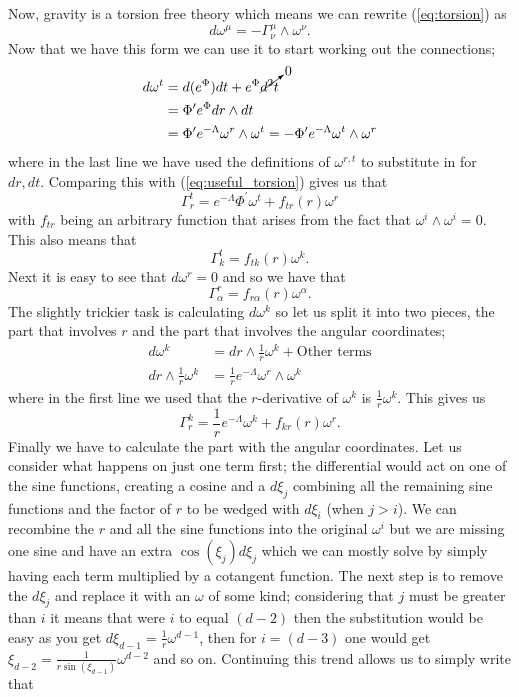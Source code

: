 \documentclass[12pt]{article}
\numberwithin{equation}{section}
\numberwithin{figure}{section}
\begin{document}
Now, gravity is a torsion free theory which means we can rewrite (\ref{eq:torsion}) as
\begin{equation}
	d\omega^{\mu}=-\Gamma^{\mu}_{\nu}\wedge\omega^{\nu}. \label{eq:useful_torsion}
\end{equation}
Now that we have this form we can use it to start working out the connections;
\begin{align}
	d\omega^{t}&=d(e^\Phi)dt+e^\Phi \cancelto{0}{d^2t}\\
	&=\Phi^{\prime}e^{\Phi}dr\wedge dt\\
	&=\Phi^{\prime}e^{-\Lambda}\omega^{r}\wedge\omega^{t}=-\Phi^{\prime}e^{-\Lambda}\omega^{t}\wedge\omega^{r}
\end{align}
where in the last line we have used the definitions of $\omega^{r,t}$ to substitute in for $dr,dt$. Comparing this with (\ref{eq:useful_torsion}) gives us that 
\begin{equation}
	\Gamma^{t}_{r}=e^{-\Lambda}\Phi^{\prime} \omega^{t} + f_{tr}(r)\omega^{r}
\end{equation}
with $f_{tr}$ being an arbitrary function that arises from the fact that $\omega^i\wedge\omega^{i}=0$. This also means that 
\begin{equation}
	\Gamma^{t}_{k}= f_{tk}(r)\omega^{k}.
\end{equation}
Next it is easy to see that $d\omega^{r}=0$ and so we have that 
\begin{equation}
	\Gamma^{r}_{\alpha}=f_{r\alpha}(r)\omega^{\alpha}.
\end{equation}
The slightly trickier task is calculating $d\omega^k$ so let us split it into two pieces, the part that involves $r$ and the part that involves the angular coordinates;
\begin{align}
	d\omega^{k}&=dr\wedge\frac{1}{r}\omega^{k} + \text{Other terms}\\
	dr\wedge\frac{1}{r}\omega^{k} &= \frac{1}{r}e^{-\Lambda}\omega^{r}\wedge\omega^{k}
\end{align}
where in the first line we used that the $r$-derivative of $\omega^{k}$ is $\frac{1}{r}\omega^{k}$. This gives us
\begin{equation}
	\Gamma^{k}_{r}= \frac{1}{r}e^{-\Lambda}\omega^{k} + f_{kr}(r)\omega^{r}.
\end{equation}
Finally we have to calculate the part with the angular coordinates. Let us consider what happens on just one term first; the differential would act on one of the sine functions, creating a cosine and a $d\xi_j$ combining all the remaining sine functions and the factor of $r$ to be wedged with $d\xi_i$ (when $j>i$). We can recombine the $r$ and all the sine functions into the original $\omega^{i}$ but we are missing one sine and have an extra $\cos(\xi_{j}) d\xi_{j}$ which we can mostly solve by simply having each term multiplied by a cotangent function. The next step is to remove the $d\xi_{j}$ and replace it with an $\omega$ of some kind; considering that $j$ must be greater than $i$ it means that were $i$ to equal $(d-2)$ then the substitution would be easy as you get $d\xi_{d-1}=\frac{1}{r}\omega^{d-1}$, then for $i=(d-3)$ one would get $\xi_{d-2}=\frac{1}{r\sin(\xi_{d-1})}\omega^{d-2}$ and so on. Continuing this trend allows us to simply write that 
\end{document}
